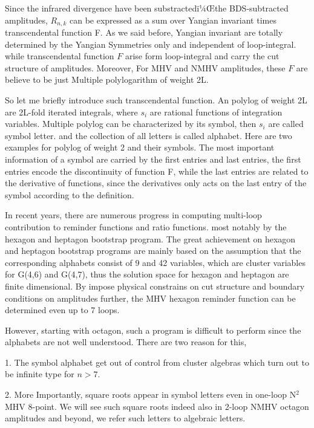 \documentclass[a4paper,11pt]{article}
\begin{document}
Since the infrared divergence have been substractedï¼Œthe BDS-subtracted amplitudes, $R_{n,k}$ can be expressed as a sum over Yangian invariant times transcendental function F. As we said before, Yangian invariant are totally determined by the Yangian Symmetries only and independent of loop-integral. while transcendental function $F$ arise form loop-integral and carry the cut structure of amplitudes. Moreover, For MHV and NMHV amplitudes, these $F$ are believe to be just Multiple polylogarithm of weight 2L.



So let me briefly introduce such transcendental function. An polylog of weight 2L are  2L-fold iterated integrals, where $s_{i}$ are rational functions of integration variables.  Multiple polylog can be characterized by its symbol, then $s_{i}$ are called symbol letter. and the collection of all letters is called alphabet. Here are two examples for polylog of weight 2 and their symbols. The most important information of a symbol are carried by the first entries and last entries, the first entries encode the discontinuity of function F, while the last entries are related to the derivative of functions, since the derivatives only acts on the last entry of the symbol according to the definition. 

In recent years, there are numerous progress in computing multi-loop contribution to reminder functions and ratio functions. most notably by the hexagon and heptagon bootstrap program. The great achievement on hexagon and heptagon bootstrap programs are mainly based on the assumption that the corresponding alphabets consist of 9 and 42 variables, which are cluster variables for G(4,6) and G(4,7), thus the solution space for hexagon and heptagon are finite dimensional. By impose physical constrains on cut structure and boundary conditions on amplitudes further, the MHV hexagon reminder function can be determined even up to 7 loops.

However, starting with octagon, such a program is difficult to perform since the alphabets are not well understood. There are two reason for this, 

1. The symbol alphabet get out of control from cluster algebras which turn out to be infinite type for $n>7$. 

2. More Importantly, square roots appear in symbol letters even in one-loop N$^{2}$MHV 8-point. We will see such square roots indeed also in 2-loop NMHV octagon amplitudes and beyond, we refer such letters to algebraic letters. 
\end{document}
